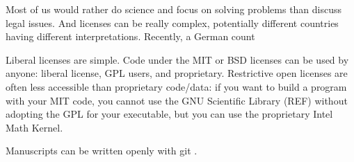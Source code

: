 \documentclass[letterpaper]{article}
\begin{document}
Most of us would rather do science and focus on solving problems than discuss
legal issues.  And licenses can be really complex, potentially different
countries having different interpretations.  Recently, a German count

Liberal licenses are simple. Code under the MIT or BSD licenses can be used by
anyone: liberal license, GPL users, and proprietary. Restrictive open licenses
are often less accessible than proprietary code/data: if you want to build a
program with your MIT code, you cannot use the GNU Scientific Library (REF)
without adopting the GPL for your executable, but you can use the proprietary
Intel Math Kernel.

Manuscripts can be written openly with git \cite{ram13}.




\end{document}
